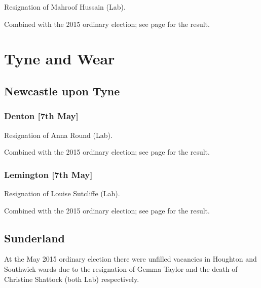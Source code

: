 \documentclass[a4paper,openany]{book}
\begin{document}
\begin{resultsiii}

Resignation of Mahroof Hussain (Lab).

Combined with the 2015 ordinary election; see page \pageref{BostonCastleRotherham} for the result.

\section{Tyne and Wear}

\subsection*{Newcastle upon Tyne}

\subsubsection*{Denton \hspace*{\fill}\nolinebreak[1]%
\enspace\hspace*{\fill}
[7th May]}


Resignation of Anna Round (Lab).

Combined with the 2015 ordinary election; see page \pageref{DentonNewcastleTyne} for the result.

\subsubsection*{Lemington \hspace*{\fill}\nolinebreak[1]%
\enspace\hspace*{\fill}
[7th May]}


Resignation of Louise Sutcliffe (Lab).

Combined with the 2015 ordinary election; see page \pageref{LemingtonNewcastleTyne} for the result.

\subsection*{Sunderland}

At the May 2015 ordinary election there were unfilled vacancies in Houghton and Southwick wards due to the resignation of Gemma Taylor and the death of Christine Shattock (both Lab) respectively.


\end{resultsiii}
\end{document}
